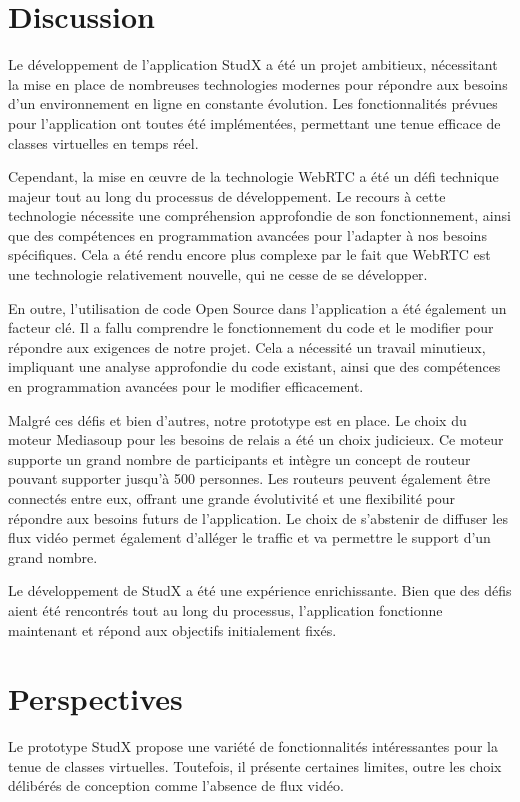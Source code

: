 \section{Discussion}
Le développement de l'application StudX a été un projet ambitieux, 
nécessitant la mise en place de nombreuses technologies modernes pour 
répondre aux besoins d'un environnement en ligne en constante évolution. 
Les fonctionnalités prévues pour l'application ont toutes été implémentées, 
permettant une tenue efficace de classes virtuelles en temps réel.

Cependant, la mise en œuvre de la technologie WebRTC a été un défi technique majeur 
tout au long du processus de développement. Le recours à cette technologie nécessite
une compréhension approfondie de son fonctionnement, ainsi que des compétences en 
programmation avancées pour l'adapter à nos besoins spécifiques. Cela a été rendu 
encore plus complexe par le fait que WebRTC est une technologie relativement nouvelle, 
qui ne cesse de se développer.


En outre, l'utilisation de code Open Source dans l'application a été également un facteur clé. 
Il a fallu comprendre le fonctionnement du code et le modifier pour répondre aux exigences de notre projet. 
Cela a nécessité un travail minutieux, impliquant une analyse approfondie du code existant, ainsi 
que des compétences en programmation avancées pour le modifier efficacement.

Malgré ces défis et bien d'autres, notre prototype est en place. Le choix du moteur Mediasoup pour les besoins de relais a été un choix judicieux. 
Ce moteur supporte un grand nombre de participants et intègre un concept de routeur pouvant supporter jusqu'à 500 personnes. 
Les routeurs peuvent également être connectés entre eux, offrant une grande évolutivité et une flexibilité pour répondre aux besoins futurs de l'application.
Le choix de s'abstenir de diffuser les flux vidéo permet également d'alléger le traffic et va permettre le support d'un grand nombre.

Le développement de StudX a été une expérience enrichissante. 
Bien que des défis aient été rencontrés tout au long du processus, 
l'application fonctionne maintenant et répond aux objectifs initialement fixés.

\section{Perspectives}
Le prototype StudX propose une variété de fonctionnalités intéressantes pour la tenue de classes virtuelles.  
Toutefois, il présente certaines limites, outre les choix délibérés de conception comme l’absence de flux vidéo. 

